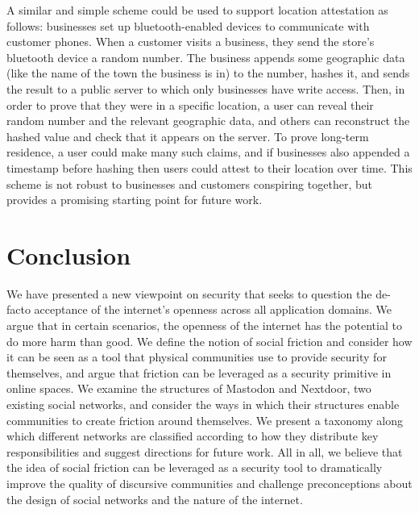 \documentclass[sigconf,authordraft]{acmart}
\begin{document}
A similar and simple scheme could be used to support location attestation as follows: businesses set up bluetooth-enabled devices to communicate with customer phones. When a customer visits a business, they send the store's bluetooth device a random number. The business appends some geographic data (like the name of the town the business is in) to the number, hashes it, and sends the result to a public server to which only businesses have write access. Then, in order to prove that they were in a specific location, a user can reveal their random number and the relevant geographic data, and others can reconstruct the hashed value and check that it appears on the server. To prove long-term residence, a user could make many such claims, and if businesses also appended a timestamp before hashing then users could  attest to their location over time. This scheme is not robust to businesses and customers conspiring together, but provides a promising starting point for future work.  


\section{Conclusion}

We have presented a new viewpoint on security that seeks to  question the de-facto acceptance of the internet's openness across all application domains. We argue that in certain scenarios, the openness of the internet has the potential to do more harm than good. We define the notion of social friction and consider how it can be seen as a tool that physical communities use to provide security for themselves, and argue that friction can be leveraged as a security primitive in online spaces. We examine the structures of Mastodon and Nextdoor, two existing social networks, and consider the ways in which their structures enable communities to create friction around themselves. We present a taxonomy along which different networks are classified according to how they distribute key responsibilities and suggest directions for future work. All in all, we believe that the idea of social friction can be leveraged as a security tool to dramatically improve the quality of discursive communities and challenge preconceptions about the design of social networks and the nature of the internet. 





\end{document}

